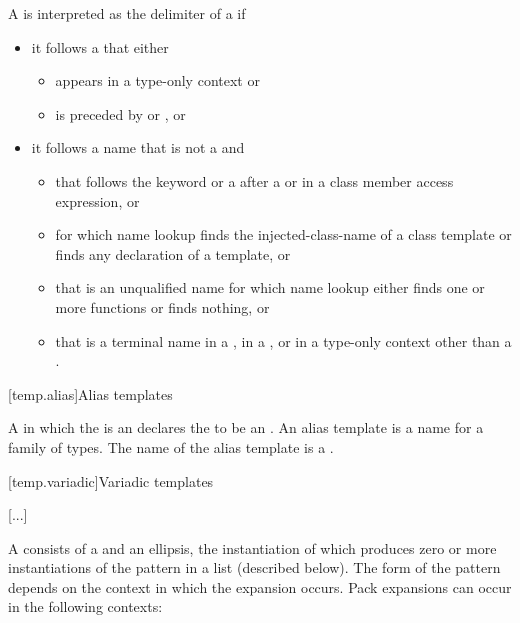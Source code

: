 \documentclass{wg21}
\begin{document}
\pnum
A \tcode{<} is interpreted as the delimiter of
a 
if 
\begin{itemize}
\item
it follows a  that either
\begin{itemize}
	\item appears in a type-only context or
	\item is preceded by  or , or
\end{itemize}
\item it follows a name that is not a  and
\begin{itemize}
	\item
	that follows the keyword  or a \tcode{\~}
	after a  or
	in a class member access expression, or
	\item
	for which name lookup finds the injected-class-name of a class template or
	finds any declaration of a template, or
	\item
	that is an unqualified name
	for which name lookup either finds one or more functions or finds nothing, or
	\item
	that is a terminal name
	in a ,
	in a , or
	in a type-only context
	other than a .
\end{itemize}
\end{itemize}

[temp.alias]{Alias templates}

\pnum
A  in which the  is an
 declares the
 to be an .
An alias template is a name for a family of
types. The name of the alias template is a .

[temp.variadic]{Variadic templates}

[...]

A 
consists of a  and an ellipsis, the instantiation of which
produces zero or more instantiations of the pattern in a list (described below).
The form of the pattern
depends on the context in which the expansion occurs. Pack
expansions can occur in the following contexts:
\end{document}
